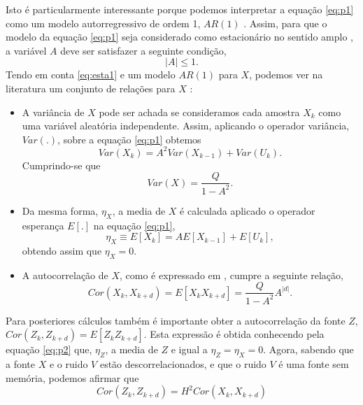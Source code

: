 \documentclass[a4paper,10pt]{article}
\begin{document}
Isto é particularmente interessante porque podemos interpretar a equação \eqref{eq:p1} como 
um modelo autorregressivo de ordem 1, $AR(1)$ \cite{ARp}. 
Assim, para que o modelo da equação \ref{eq:p1} seja considerado como estacionário no 
sentido amplo \cite{estaW}, a variável $A$ deve ser satisfazer a seguinte condição,
\begin{equation} \label{eq:esta1}
|A | \leq 1.
\end{equation}
Tendo em conta \eqref{eq:esta1} e um modelo $AR(1)$ para $X$, podemos ver na literatura \cite{ARp}
um conjunto de relações para $X$ :
\begin{itemize}
 \item A variância de $X$ pode ser achada se consideramos 
cada amostra $X_k$ como uma variável aleatória independente.
Assim, aplicando o operador variância, $Var(.)$, sobre a equação \eqref{eq:p1} obtemos
\begin{equation} \label{eq:AR1var}
Var(X_k)=A^2Var(X_{k-1})+Var(U_k).
\end{equation}
Cumprindo-se que
\begin{equation} \label{eq:AR1var0}
Var(X)=\frac{Q}{1-A^2}.
\end{equation}
 \item Da mesma forma, $\eta_{X}$, a media de $X$ é calculada 
 aplicado o operador esperança $E[.]$ na equação \eqref{eq:p1}, 
 \begin{equation} \label{eq:AR1var_1}
\eta_{X} \equiv E[X_k]=A E[X_{k-1}]+E[U_k],
\end{equation}
obtendo assim que $\eta_X=0$.
 \item A autocorrelação de $X$, como é expressado em \cite{ARp,art1}, cumpre a seguinte relação,
\begin{equation} \label{eq:AR1auto}
Cor(X_k,X_{k+d})=E[X_k X_{k+d}]=\frac{Q}{1-A^2} A^{|d|}. 
\end{equation}
\end{itemize}
 
Para posteriores cálculos também é importante obter a autocorrelação
da fonte $Z$, $Cor(Z_k,Z_{k+d})=E[Z_k Z_{k+d}]$. Esta expressão é obtida
conhecendo pela equação \eqref{eq:p2} que, $\eta_{Z}$, a media de $Z$ e igual a $\eta_{Z}=\eta_{X}=0$.
Agora, sabendo que a fonte $X$ e o ruido $V$ estão descorrelacionados, e que  
o ruido $V$ é uma fonte sem memória, podemos afirmar que
\begin{equation} \label{eq:AR1auto3}
Cor(Z_k,Z_{k+d})=H^2 Cor(X_k, X_{k+d})
\end{equation}   
\end{document}
